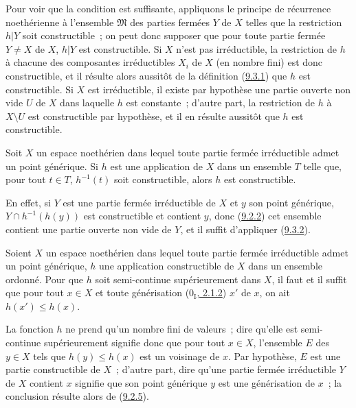 Pour voir que la condition est suffisante, appliquons le principe de
récurrence noethérienne à l'ensemble $\mathfrak{M}$ des parties fermées $Y$
de $X$ telles que la restriction $h|Y$ soit constructible~; on peut donc
supposer que pour toute partie fermée $Y\ne X$ de $X$, $h|Y$ est
constructible. Si $X$ n'est pas irréductible, la restriction de $h$ à
chacune des composantes irréductibles $X_i$ de $X$ (en nombre fini) est donc
constructible, et il résulte alors aussitôt de la définition
(\hyperref[0.9.3.1-fr]{9.3.1}) que $h$ est constructible. Si $X$ est
irréductible, il existe par hypothèse une partie ouverte non vide $U$ de $X$
dans laquelle $h$ est constante~; d'autre part, la restriction de $h$ à
$X\setminus U$ est constructible par hypothèse, et il en résulte aussitôt
que $h$ est constructible.

\begin{corollary}[9.3.3]
\label{0.9.3.3-fr}
Soit $X$ un espace noethérien dans lequel toute partie fermée irréductible
admet un point générique. Si $h$ est une application de $X$ dans un ensemble
$T$ telle que, pour tout $t\in T$, $h^{-1}(t)$ soit constructible, alors $h$
est constructible.
\end{corollary}

En effet, si $Y$ est une partie fermée irréductible de $X$ et $y$ son point
générique, $Y\cap h^{-1}(h(y))$ est constructible et contient $y$, donc
(\hyperref[0.9.2.2-fr]{9.2.2}) cet ensemble contient une partie ouverte non
vide de $Y$, et il suffit d'appliquer (\hyperref[0.9.3.2-fr]{9.3.2}).

\begin{proposition}[9.3.4]
\label{0.9.3.4-fr}
Soient $X$ un espace noethérien dans lequel toute partie fermée irréductible
admet un point générique, $h$ une application constructible de $X$ dans un
ensemble ordonné. Pour que $h$ soit semi-continue supérieurement dans $X$,
il faut et il suffit que pour tout $x\in X$ et toute générisation
(\hyperref[0.2.1.2-fr]{$0_{\mathrm I}$, 2.1.2}) $x'$ de $x$, on ait
$h(x')\leq h(x)$.
\end{proposition}

La fonction $h$ ne prend qu'un nombre fini de valeurs~; dire qu'elle est
semi-continue supérieurement signifie donc que pour tout $x\in X$,
l'ensemble $E$ des $y\in X$ tels que $h(y)\leq h(x)$ est un voisinage de $x$.
Par hypothèse, $E$ est une partie constructible de $X$~; d'autre part, dire
qu'une partie fermée irréductible $Y$ de $X$ contient $x$ signifie que son
point générique $y$ est une générisation de $x$~; la conclusion résulte
alors de (\hyperref[0.9.2.5-fr]{9.2.5}).

